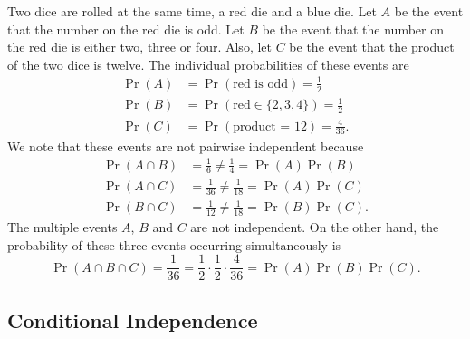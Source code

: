 \begin{example}
Two dice are rolled at the same time, a red die and a blue die.
Let $A$ be the event that the number on the red die is odd.
Let $B$ be the event that the number on the red die is either two, three or four.
Also, let $C$ be the event that the product of the two dice is twelve.
The individual probabilities of these events are
\begin{align*}
\Pr (A) &= \Pr (\text{red is odd}) = \frac{1}{2} \\
\Pr (B) &= \Pr (\text{red} \in \{2, 3, 4\}) = \frac{1}{2} \\
\Pr (C) &= \Pr (\text{product = 12}) = \frac{4}{36} .
\end{align*}
We note that these events are not pairwise independent because
\begin{align*}
\Pr (A \cap B) &= \frac{1}{6} \neq \frac{1}{4} = \Pr(A) \Pr(B) \\
\Pr (A \cap C) &= \frac{1}{36} \neq \frac{1}{18} = \Pr(A) \Pr(C) \\
\Pr (B \cap C) &= \frac{1}{12} \neq \frac{1}{18} = \Pr(B) \Pr(C) .
\end{align*}
The multiple events $A$, $B$ and $C$ are not independent.
On the other hand, the probability of these three events occurring simultaneously is
\begin{equation*}
\Pr (A \cap B \cap C) = \frac{1}{36}
= \frac{1}{2} \cdot \frac{1}{2} \cdot \frac{4}{36}
= \Pr (A) \Pr (B) \Pr (C) .
\end{equation*}
\end{example}

\subsection{Conditional Independence}

